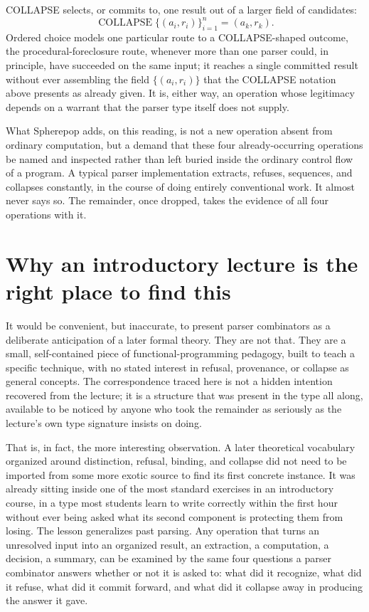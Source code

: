 \documentclass[11pt]{article}
\begin{document}
COLLAPSE selects, or commits to, one result out of a larger field of candidates:
\[
\operatorname{COLLAPSE}\{(a_i, r_i)\}_{i=1}^{n} = (a_k, r_k).
\]
Ordered choice models one particular route to a COLLAPSE-shaped outcome, the procedural-foreclosure route, whenever more than one parser could, in principle, have succeeded on the same input; it reaches a single committed result without ever assembling the field $\{(a_i, r_i)\}$ that the COLLAPSE notation above presents as already given. It is, either way, an operation whose legitimacy depends on a warrant that the parser type itself does not supply.

What Spherepop adds, on this reading, is not a new operation absent from ordinary computation, but a demand that these four already-occurring operations be named and inspected rather than left buried inside the ordinary control flow of a program. A typical parser implementation extracts, refuses, sequences, and collapses constantly, in the course of doing entirely conventional work. It almost never says so. The remainder, once dropped, takes the evidence of all four operations with it.

\section{Why an introductory lecture is the right place to find this}

It would be convenient, but inaccurate, to present parser combinators as a deliberate anticipation of a later formal theory. They are not that. They are a small, self-contained piece of functional-programming pedagogy, built to teach a specific technique, with no stated interest in refusal, provenance, or collapse as general concepts. The correspondence traced here is not a hidden intention recovered from the lecture; it is a structure that was present in the type all along, available to be noticed by anyone who took the remainder as seriously as the lecture's own type signature insists on doing.

That is, in fact, the more interesting observation. A later theoretical vocabulary organized around distinction, refusal, binding, and collapse did not need to be imported from some more exotic source to find its first concrete instance. It was already sitting inside one of the most standard exercises in an introductory course, in a type most students learn to write correctly within the first hour without ever being asked what its second component is protecting them from losing. The lesson generalizes past parsing. Any operation that turns an unresolved input into an organized result, an extraction, a computation, a decision, a summary, can be examined by the same four questions a parser combinator answers whether or not it is asked to: what did it recognize, what did it refuse, what did it commit forward, and what did it collapse away in producing the answer it gave.
\end{document}

